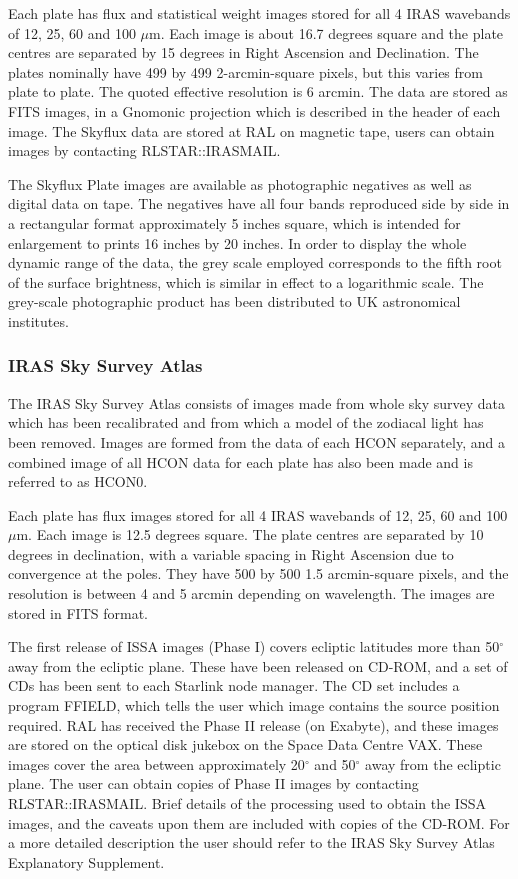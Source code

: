 Each plate has flux and statistical weight images stored for all 4 IRAS
wavebands of 12, 25, 60 and 100 $\mu$m.
Each image is about 16.7 degrees square and the plate centres are separated by
15 degrees in Right Ascension and Declination. The plates nominally have
499 by 499 2-arcmin-square pixels, but this varies from plate to plate.
The quoted effective resolution is 6 arcmin.
The data are stored as FITS images, in a Gnomonic projection which is
described in the header of each image.
The Skyflux data are stored at RAL on magnetic tape, users can obtain
images by contacting RLSTAR::IRASMAIL.

The Skyflux Plate images are available as photographic negatives as well as
digital data on tape.
The negatives have all four bands reproduced side by side in a rectangular
format approximately 5 inches square, which is intended for enlargement to
prints 16 inches by 20 inches.
In order to display the whole dynamic range of the data, the grey scale employed
corresponds to the fifth root of the surface brightness, which is similar in
effect to a logarithmic scale.
The grey-scale photographic product has been distributed to UK astronomical
institutes.

\subsubsection{IRAS Sky Survey Atlas}
The IRAS Sky Survey Atlas consists of images made from whole sky survey data
which has been recalibrated and from which a model of the zodiacal light has
been removed.
Images are formed from the data of each HCON separately, and a combined image
of all HCON data for each plate has also been made and is referred to as HCON0.

Each plate has flux images stored for all 4 IRAS wavebands of 12, 25, 60 and
100 $\mu$m.
Each image is 12.5 degrees square. The plate centres are separated by 10 degrees
in declination, with a variable spacing in Right Ascension due to convergence at
the poles. They have 500 by 500 1.5 arcmin-square pixels, and the resolution is
between 4 and 5 arcmin depending on wavelength.
The images are stored in FITS format.

The first release of ISSA images (Phase I) covers ecliptic latitudes more than
50$^{\circ}$ away from the ecliptic plane. These have been released on CD-ROM,
and a set of CDs has been sent to each Starlink node manager.
The CD set includes a program FFIELD, which tells the user which image
contains the source position required.
RAL has received the Phase II release (on Exabyte), and these images are stored
on the optical disk jukebox on the Space Data Centre VAX. These images cover
the area between approximately 20$^{\circ}$ and 50$^{\circ}$ away from the
ecliptic plane.
The user can obtain copies of Phase II images by contacting RLSTAR::IRASMAIL.
Brief details of
the processing used to obtain the ISSA images, and the caveats upon them are
included with copies of the CD-ROM. For a more detailed description the user
should refer to the IRAS Sky Survey Atlas Explanatory Supplement.

